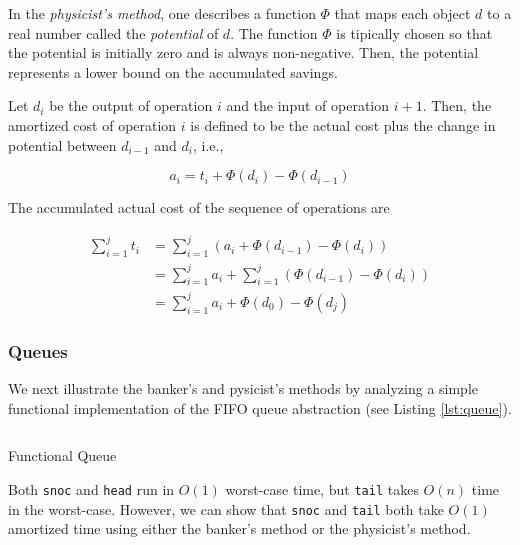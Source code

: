 \documentclass[12pt, a4paper]{article} %
\newcommand{\code}[1]{\texttt{#1}} %
\begin{document}
In the \textit{physicist's method}, one describes a function $\Phi$ that maps each object $d$ to a real number called the \textit{potential} of $d$. The function $\Phi$ is tipically chosen so that the potential is initially zero and is always non-negative. Then, the potential represents a lower bound on the accumulated savings.

Let $d_i$ be the output of operation $i$ and the input of operation $i+1$. Then, the amortized cost of operation $i$ is defined to be the actual cost plus the change in potential between $d_{i-1}$ and $d_i$, i.e.,

\begin{equation}%
\label{physicist's method equation}
  a_i = t_i + \Phi(d_i) - \Phi(d_{i-1})
\end{equation}

The accumulated actual cost of the sequence of operations are

\begin{align*}%
\label{physicist's cost}
  \sum_{i=1}^{j} t_i &= \sum_{i=1}^{j} (a_i + \Phi(d_{i-1}) - \Phi(d_i)) \\
                     &= \sum_{i=1}^{j} a_i + \sum_{i=1}^{j} (\Phi(d_{i-1}) - \Phi(d_i)) \\
                     &= \sum_{i=1}^{j} a_i + \Phi(d_0) - \Phi(d_j)
\end{align*}


\subsubsection{Queues}%
\label{subsub:Queues}

We next illustrate the banker's and pysicist's methods by analyzing a simple functional implementation of the FIFO queue abstraction (see Listing \ref{lst:queue}).

\begin{listing}[H]
    \inputminted[breaklines=true]{haskell}{../../Chapter5/BatchedQueue.hs}
    \caption{Functional Queue}
    \label{lst:queue}
\end{listing}

Both \code{snoc} and \code{head} run in $O(1)$ worst-case time, but \code{tail} takes $O(n)$ time in the worst-case. However, we can show that \code{snoc} and \code{tail} both take $O(1)$ amortized time using either the banker's method or the physicist's method.
\end{document}
